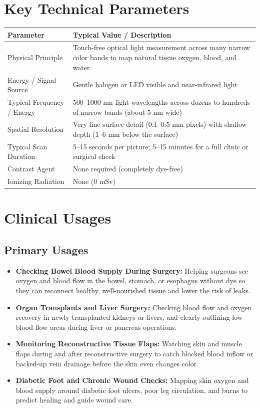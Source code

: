 \section{Key Technical Parameters}
\noindent
\begin{tabularx}{\textwidth}{@{}l X@{}}
\toprule
\textbf{Parameter} & \textbf{Typical Value / Description} \\
\midrule
Physical Principle & Touch-free optical light measurement across many narrow color bands to map natural tissue oxygen, blood, and water \\
Energy / Signal Source & Gentle halogen or LED visible and near-infrared light \\
Typical Frequency / Energy & 500--1000 nm light wavelengths across dozens to hundreds of narrow bands (about 5 nm wide) \\
Spatial Resolution & Very fine surface detail (0.1--0.5 mm pixels) with shallow depth (1--6 mm below the surface) \\
Typical Scan Duration & 5--15 seconds per picture; 5--15 minutes for a full clinic or surgical check \\
Contrast Agent & None required (completely dye-free) \\
Ionizing Radiation & None (0 mSv) \\
\bottomrule
\end{tabularx}

\section{Clinical Usages}

\subsection{Primary Usages}
\begin{itemize}
    \item \textbf{Checking Bowel Blood Supply During Surgery:} Helping surgeons see oxygen and blood flow in the bowel, stomach, or esophagus without dye so they can reconnect healthy, well-nourished tissue and lower the risk of leaks.
    \item \textbf{Organ Transplants and Liver Surgery:} Checking blood flow and oxygen recovery in newly transplanted kidneys or livers, and clearly outlining low-blood-flow areas during liver or pancreas operations.
    \item \textbf{Monitoring Reconstructive Tissue Flaps:} Watching skin and muscle flaps during and after reconstructive surgery to catch blocked blood inflow or backed-up vein drainage before the skin even changes color.
    \item \textbf{Diabetic Foot and Chronic Wound Checks:} Mapping skin oxygen and blood supply around diabetic foot ulcers, poor leg circulation, and burns to predict healing and guide wound care.
\end{itemize}

